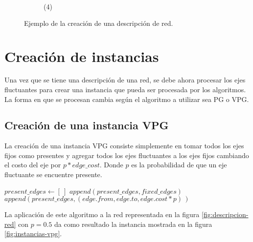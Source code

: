 \begin{figure}
\begin{subfigure}[b]{0.25\textwidth}
\vfil
\caption*{(4)}
\end{subfigure}

\caption{Ejemplo de la creación de una descripción de red.}
\label{fig:creacion-descripcion-red}
\end{figure}

\section{Creación de instancias}
Una vez que se tiene una descripción de una red, se debe ahora procesar los ejes fluctuantes para crear una instancia que pueda ser procesada por los algoritmos. La forma en que se procesan cambia según el algoritmo a utilizar sea PG o VPG.

\subsection{Creación de una instancia VPG}
La creación de una instancia VPG consiste simplemente en tomar todos los ejes fijos como presentes y agregar todos los ejes fluctuantes a los ejes fijos cambiando el costo del eje por $p*edge\_cost$. Donde $p$ es la probabilidad de que un eje fluctuante se encuentre presente.

\begin{algorithm}
\begin{algorithmic}[1]
	\State $present\_edges \gets [\:]$
	\State $append(present\_edges, fixed\_edges)$
		\State $append(present\_edges, (edge.from, edge.to, edge.cost * p)\,)$
	\EndFor
\EndFunction
\end{algorithmic}
\end{algorithm}

La aplicación de este algoritmo a la red representada en la figura \ref{fig:descripcion-red} con $p=0.5$ da como resultado la instancia mostrada en la figura \ref{fig:instancias-vpg}.

